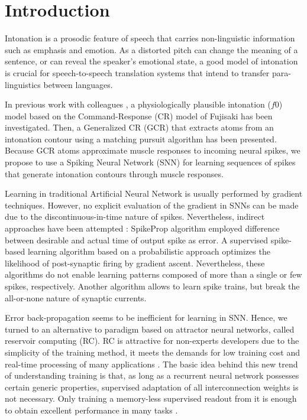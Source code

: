 \documentclass[11pt, a4paper]{article} %
\begin{document}
\section{Introduction}
Intonation is a prosodic feature of speech that carries non-linguistic information such as emphasis and emotion. As a distorted pitch can change the meaning of a sentence, or can reveal the speaker's emotional state, a good model of intonation is crucial for speech-to-speech translation systems that intend to transfer para-linguistics between languages.

In previous work with colleagues \cite{honnet2015atom}, a physiologically plausible intonation ($f0$) model based on the Command-Response (CR) model of Fujisaki \cite{fujisaki1998command} has been investigated. Then, a Generalized CR (GCR) \cite{schnell2018neural} that extracts atoms from an intonation contour using a matching pursuit algorithm \cite{mallat1993matching} has been presented. Because GCR atoms approximate muscle responses to incoming neural spikes, we propose to use a Spiking Neural Network (SNN) for learning sequences of spikes that generate intonation contours through muscle responses.

Learning in traditional Artificial Neural Network is usually performed by gradient techniques. However, no explicit evaluation of the gradient in SNNs can be made due to the discontinuous-in-time nature of spikes. Nevertheless, indirect approaches have been attempted :
SpikeProp algorithm \cite{bohte2002error} employed difference between desirable and actual time of output spike as error. A supervised spike-based learning algorithm based on a probabilistic approach \cite{pfister2006optimal} optimizes the likelihood of post-synaptic firing by gradient ascent. Nevertheless, these algorithms do not enable learning patterns composed of more than a single or few spikes, respectively.
Another algorithm \cite{huh2018gradient} allows to learn spike trains, but break the all-or-none nature of synaptic currents.

Error back-propagation seems to be inefficient for learning in SNN. Hence, we turned to an alternative to paradigm based on attractor neural networks, called reservoir computing (RC). RC is attractive for non-experts developers due to the simplicity of the training method, it meets the demands for low training cost and real-time processing of many applications \cite{tanaka2019recent}. The basic idea behind this new trend of understanding training is that, as long as a recurrent neural network possesses certain generic properties, supervised adaptation of all interconnection weights is not necessary. Only training a memory-less supervised readout from it is enough to obtain excellent performance in many tasks \cite{lukovsevivcius2012reservoir}. 
\end{document}
